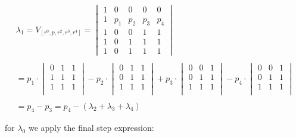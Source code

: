 		\begin{equation}
		\begin{align*}
		
		
			\lambda_1 =	V_{[r^0,p,r^2,r^3,r^4]} = 
			\begin{vmatrix}
				1 & 0 & 0 & 0 & 0\\ 
				1 & p_{1} &  p_{2}& p_{3} & p_{4}\\
				1 & 0 & 0 & 1 & 1\\ 
				1 &  0  & 1 & 1 & 1 \\ 
				1 & 0 & 1 & 1 & 1
				\end{vmatrix} \\  \\ 
				
				= p_1 \cdot \begin{vmatrix} 0 & 1 & 1 \\ 1 & 1 & 1 \\ 1 & 1 & 1 \\ \end{vmatrix} - 
				p_2 \cdot \begin{vmatrix} 0 & 1 & 1 \\ 0 & 1 & 1 \\ 1 & 1 & 1 \\ \end{vmatrix} + 
				p_3 \cdot \begin{vmatrix} 0 & 0 & 1 \\0 & 1 & 1 \\ 1 & 1 & 1 \\ \end{vmatrix} - 
				p_4 \cdot \begin{vmatrix} 0 & 0 & 1 \\ 0 & 1 & 1 \\ 1 & 1 & 1 \\ \end{vmatrix} \\ \\ 
				
				= p_4 - p_3 = p_4 - (\lambda_2 + \lambda_3 + \lambda_4)
		\end{align*}
		\end{equation}	
		
		
		for $\lambda_0$ we apply the final step expression:
		
